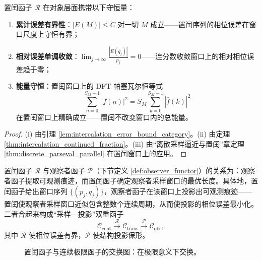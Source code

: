 \begin{proposition}[置闰函子的守恒量]\label{prop:intercalation_conservation}
置闰函子 $\mathcal{R}$ 在对象层面携带以下守恒量：
\begin{enumerate}[label=(\roman*)]
    \item \textbf{累计误差有界性}：$|E(M)|\le C$ 对一切 $M$ 成立——置闰序列的相位误差在窗口尺度上守恒有界；
    \item \textbf{相对误差单调收敛}：$\displaystyle\lim_{j\to\infty}\frac{|E(q_j)|}{p_j}=0$——连分数收敛窗口上的相对相位误差趋于零；
    \item \textbf{能量守恒}：置闰窗口上的 DFT 帕塞瓦尔恒等式
    \[
    \sum_{n=0}^{S_M-1}|f(n)|^2=S_M\sum_{k=0}^{S_M-1}|\hat{f}(k)|^2
    \]
    在置闰窗口上精确成立——置闰不改变窗口内的总能量。
\end{enumerate}
\end{proposition}

\begin{proof}
(i) 由引理 \ref{lem:intercalation_error_bound_category}。(ii) 由定理 \ref{thm:intercalation_continued_fraction}。(iii) 由“离散采样逼近与置闰”章定理 \ref{thm:discrete_parseval_parallel} 在置闰窗口上的应用。
\end{proof}

\begin{remark}[置闰函子与观察者函子的接口]\label{rem:intercalation_observer_interface}
置闰函子 $\mathcal{R}$ 与观察者函子 $\mathcal{P}$（下节定义 \ref{def:observer_functor}）的关系为：观察者函子提取可观测痕迹，而置闰函子确定观察者采样窗口的最优长度。具体地，置闰函子给出窗口序列 $\{(p_j,q_j)\}$，观察者函子在该窗口上投影出可观测痕迹——置闰使观察者采样窗口近似包含整数个连续周期，从而使投影的相位误差最小化。二者合起来构成“采样—投影”双重函子
\[
\mathcal{C}_{\text{cont}}\xrightarrow{\mathcal{R}}\mathcal{C}_{\text{trans}}\xrightarrow{\mathcal{P}}\mathcal{C}_{\text{obs}},
\]
其中 $\mathcal{R}$ 使相位误差有界，$\mathcal{P}$ 使结构投影保形。
\end{remark}

\begin{figure}[htbp]
\centering
{}
\caption{置闰函子与连续极限函子的交换图：在极限意义下交换。}
\label{fig:intercalation_commutation}
\end{figure}

